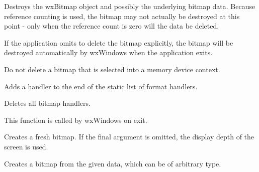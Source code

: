 

Destroys the wxBitmap object and possibly the underlying bitmap data.
Because reference counting is used, the bitmap may not actually be
destroyed at this point - only when the reference count is zero will the
data be deleted.

If the application omits to delete the bitmap explicitly, the bitmap will be
destroyed automatically by wxWindows when the application exits.

Do not delete a bitmap that is selected into a memory device context.

\label{wxbitmapaddhandler}


Adds a handler to the end of the static list of format handlers.






Deletes all bitmap handlers.

This function is called by wxWindows on exit.



Creates a fresh bitmap. If the final argument is omitted, the display depth of
the screen is used.


Creates a bitmap from the given data, which can be of arbitrary type.





